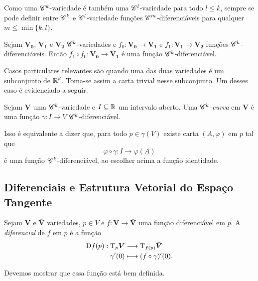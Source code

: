Como uma $\mathscr{C}^k$-variedade é também uma $\mathscr{C}^l$-variedade para todo $l\leq k$, sempre se pode definir entre $\mathscr{C}^k$ e $\mathscr{C}^l$-variedade funções $\mathscr{C}^m$-diferenciáveis para qualquer $m \leq \min\{k,l\}$.

\begin{prop}
Sejam $\bm{V_0}$, $\bm{V_1}$ e $\bm{V_2}$ $\mathscr{C}^k$-variedades e $f_0: \bm{V_0} \to \bm{V_1}$ e $f_1: \bm{V_1} \to \bm{V_2}$ funções $\mathscr{C}^k$-diferenciáveis. Então $f_1 \circ f_0: \bm{V_0} \to \bm{V_1}$ é uma função $\mathscr{C}^k$-diferenciável.
\end{prop}

Casos particulares relevantes são quando uma das duas variedades é um subconjunto de $\mathbb{R}^d$. Toma-se assim a carta trivial nesse subconjunto. Um desses caso é evidenciado a seguir.

\begin{defi}
Sejam $\bm V$ uma $\mathscr{C}^k$-variedade e $I \subseteq \mathbb{R}$ um intervalo aberto. Uma \emph{$\mathscr{C}^k$-curva} em $\bm V$ é uma função $\gamma: I \to V$ $\mathscr{C}^k$-diferenciável.
\end{defi}

Isso é equivalente a dizer que, para todo $p \in \gamma(V)$ existe carta $(A,\varphi)$ em $p$ tal que
	\begin{equation*}
	\varphi \circ \gamma: I \to \varphi(A)
	\end{equation*}
é uma função $\mathscr{C}^k$-diferenciável, ao escolher acima a função identidade.

\subsection{Diferenciais e Estrutura Vetorial do Espaço Tangente}

\begin{defi}
Sejam $\bm V$ e $\bm{\bar V}$ variedades, $p \in V$ e $f: \bm V \to \bm{\bar V}$ uma função diferenciável em $p$. A \emph{diferencial} de $f$ em $p$ é a função
	\begin{align*}
	{\mathrm{D}f(p)}: {\mathrm{T}_p\bm V} &\longrightarrow {\mathrm{T}_{f(p)}\bm{\bar V}} \\{\gamma'(0)} &\longmapsto {(f \circ \gamma)'(0)}.
	\end{align*}
\end{defi}

Devemos mostrar que essa função está bem definida.

